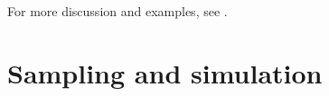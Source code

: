 \begin{example}
%
%
\end{example}

For more discussion and examples, see \cite[Ch.~1, Sec.~1.2.1]{evans}.










 
\section{Sampling and simulation}

